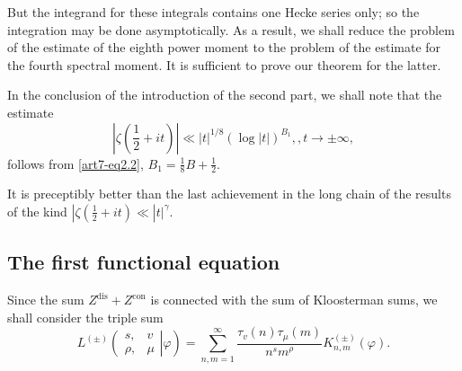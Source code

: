 But the integrand for these integrals contains one Hecke series only; so the integration may be done asymptotically. As a result, we shall reduce the problem of the estimate of the eighth power moment to the problem of the estimate for the fourth spectral moment. It is sufficient to prove  our theorem for the latter. 

In the conclusion of the introduction of the second part, we shall note that the estimate 
$$
|\zeta(\frac{1}{2} + it)| \ll  |t|^{1/8} (\log |t|)^{B_1} ,, t \to \pm \infty, 
$$
follows from \eqref{art7-eq2.2}, $B_1 = \frac{1}{8} B + \frac{1}{2}$.

It is preceptibly better than the last achievement in the long chain of the results of the kind $|\zeta(\frac{1}{2} + it) \ll |t|^\gamma$.


\subsection{The first functional equation}\label{art7-subsec2.2}
Since the sum $Z^{\text{dis}} + Z^{\text{con}}$ is connected with the sum of Kloosterman sums, we shall consider the triple sum 
\setcounter{section}{3}
\setcounter{equation}{0}
\begin{equation}
L^{(\pm)} 
\left( 
\left. 
\begin{matrix}
s, & v \\
\rho, & \mu 
\end{matrix}
\right| \varphi 
\right) = \sum\limits^\infty_{n, m=1} 
\frac{\tau_v (n) \tau_\mu (m)}{n^s m^\rho} K^{(\pm)}_{n,m} (\varphi).
\label{art7-eq3.1}
\end{equation}

